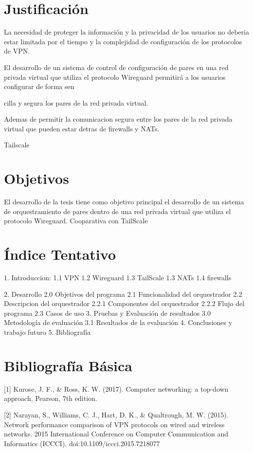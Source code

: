 \documentclass{article}
\begin{document}
\section{Justificación}
    
La necesidad de proteger la información y la privacidad de los usuarios no deberia estar limitada por el tiempo y la complejidad de configuración de los protocolos de VPN. 



El desarrollo de un sistema de control de configuración de pares en una red privada virtual que utiliza el protocolo Wireguard permitirá a los usuarios configurar de forma sen


cilla y segura los pares de la red privada virtual.

Ademas de permitir la comunicacion segura entre los pares de la red privada virtual que pueden estar detras de firewalls y NATs.

Tailscale

\section{Objetivos}

El desarrollo de la tesis tiene como objetivo principal el desarrollo de un sistema de orquestramiento de pares dentro de una red privada virtual que utiliza el protocolo Wireguard.
Cooparativa con TailScale

\section{Índice Tentativo}

1. Introduccion:
    1.1 VPN
    1.2 Wireguard
    1.3 TailScale
    1.3 NATs
    1.4 firewalls

2. Desarrollo
    2.0 Objetivos del programa
    2.1 Funcionalidad del orquestrador
    2.2 Descripcion del orquestrador
    2.2.1 Componentes del orquestrador
    2.2.2 Flujo del programa
    2.3 Casos de uso
3. Pruebas y Evaluación de resultados 
    3.0 Metodología de evaluación
    3.1 Resultados de la evaluación
4. Conclusiones y trabajo futuro 
5. Bibliografía 

\section{Bibliografía Básica}
[1] Kurose, J. F., & Ross, K. W. (2017). Computer networking: a top-down approach,
Pearson, 7th edition.

[2] Narayan, S., Williams, C. J., Hart, D. K., & Qualtrough, M. W. (2015). Network performance comparison of VPN protocols on wired and wireless networks. 2015 International Conference on Computer Communication and Informatics (ICCCI). doi:10.1109/iccci.2015.7218077
\end{document}
